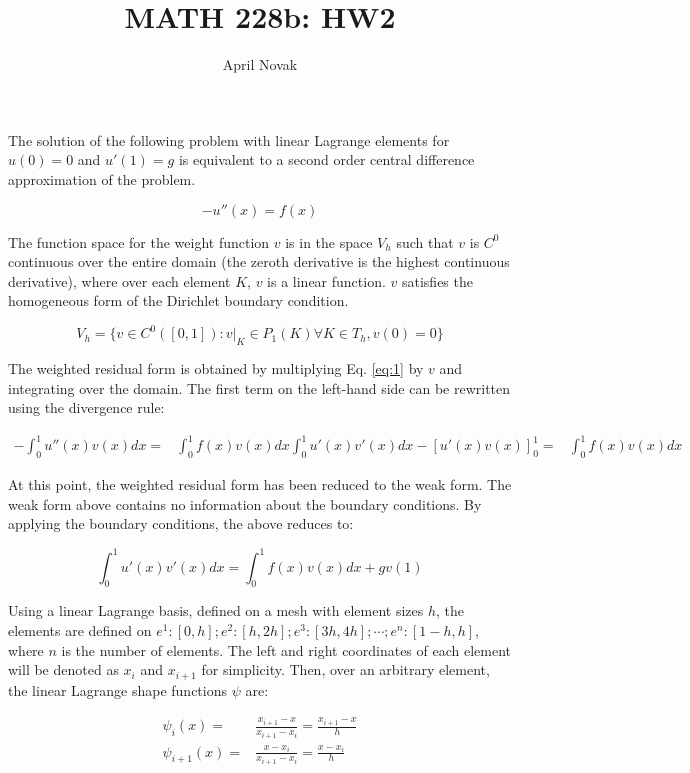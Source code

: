 \documentclass[10pt]{article}
\newcommand{\beq}{\begin{equation}}
\newcommand{\eeq}{\end{equation}}
\newcommand{\beqa}{\begin{equation}\begin{aligned}}
\newcommand{\eeqa}{\end{aligned}\end{equation}}
\begin{document}
\title{MATH 228b: HW2}
\author{April Novak}

\maketitle

\section{} 

The solution of the following problem with linear Lagrange elements for \(u(0)=0\) and \(u'(1)=g\) is equivalent to a second order central difference approximation of the problem. 

\beq
\label{eq:1}
-u''(x)=f(x)
\eeq

The function space for the weight function \(v\) is in the space \(V_h\) such that \(v\) is \(C^0\) continuous over the entire domain (the zeroth derivative is the highest continuous derivative), where over each element \(K\), \(v\) is a linear function. \(v\) satisfies the homogeneous form of the Dirichlet boundary condition.

\beq
V_h=\{v\in C^0([0,1]): v\rvert_K\in P_1(K) \forall K\in T_h, v(0)=0\}
\eeq

The weighted residual form is obtained by multiplying Eq. \eqref{eq:1} by \(v\) and integrating over the domain. The first term on the left-hand side can be rewritten using the divergence rule:

\beqa
-\int_0^1 u''(x)v(x)dx=& \int_0^1 f(x)v(x)dx
\int_0^1 u'(x)v'(x)dx-\left\lbrack u'(x)v(x)\right\rbrack_0^1=& \int_0^1 f(x)v(x)dx
\eeqa

At this point, the weighted residual form has been reduced to the weak form. The weak form above contains no information about the boundary conditions. By applying the boundary conditions, the above reduces to:

\beq
\int_0^1 u'(x)v'(x)dx=\int_0^1 f(x)v(x)dx+gv(1)
\eeq

Using a linear Lagrange basis, defined on a mesh with element sizes \(h\), the elements are defined on \(e^1: [0, h]; e^2: [h, 2h]; e^3: [3h, 4h]; \cdots; e^n: [1-h, h]\), where \(n\) is the number of elements. The left and right coordinates of each element will be denoted as \(x_i\) and \(x_{i+1}\) for simplicity. Then, over an arbitrary element, the linear Lagrange shape functions \(\psi\) are:

\beqa
\psi_i(x)=& \frac{x_{i+1}-x}{x_{i+1}-x_i}=\frac{x_{i+1}-x}{h}\\
\psi_{i+1}(x) =& \frac{x-x_i}{x_{i+1}-x_i}=\frac{x-x_i}{h}\\
\eeqa
\end{document}
